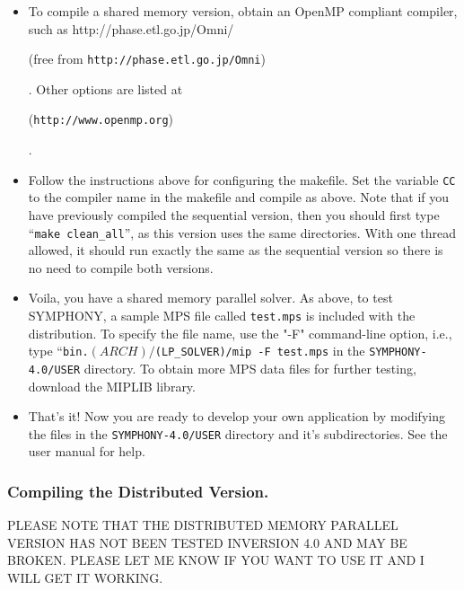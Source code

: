 \begin{itemize}
        \item To compile a shared memory version, obtain an OpenMP
        compliant compiler, such as 
        {http://phase.etl.go.jp/Omni/}
\begin{latexonly} 
        (free from {\tt http://phase.etl.go.jp/Omni})
\end{latexonly}. 
        Other options are listed at 
\begin{latexonly}
        ({\tt http://www.openmp.org})
\end{latexonly}.

        \item Follow the instructions above for configuring the makefile. Set
the variable {\tt CC} to the compiler name in the makefile and compile as
above. Note that if you have previously compiled the sequential version, then
you should first type ``{\tt make clean\_all}'', as this version uses the same
directories.  With one thread allowed, it should run exactly the same as the
sequential version so there is no need to compile both versions.

        \item Voila, you have a shared memory parallel solver. As above, to
test SYMPHONY, a sample MPS file called \texttt{test.mps} is included with the
distribution. To specify the file name, use the "-F" command-line option,
i.e., type ``\texttt{bin.$(ARCH)/$(LP\_SOLVER)/mip -F test.mps} in the
\texttt{SYMPHONY-4.0/USER} directory. To obtain more MPS data files for further
testing, download the MIPLIB library.

\item That's it! Now you are ready to develop your own application by modifying
the files in the \texttt{SYMPHONY-4.0/USER} directory and it's
subdirectories. See the user manual for help.

\end{itemize}

\subsubsection{Compiling the Distributed Version.}

PLEASE NOTE THAT THE DISTRIBUTED MEMORY PARALLEL VERSION HAS NOT BEEN TESTED
INVERSION 4.0 AND MAY BE BROKEN. PLEASE LET ME KNOW IF YOU WANT TO USE IT AND
I WILL GET IT WORKING.

